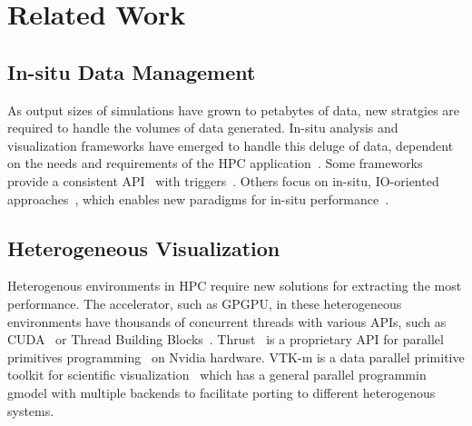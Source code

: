 \section{Related Work}
\subsection{In-situ Data Management}
As output sizes of simulations have grown to petabytes of data, new stratgies are required to handle the volumes of data generated. In-situ analysis and visualization frameworks have emerged to handle this deluge of data, dependent on the needs and requirements of the HPC application~\cite{Abbasi2010, Ayachit:2015:PCE:2828612.2828624,Childs:VisIt-HPV-Chapter:2012, 6846460}. Some frameworks provide a consistent API~\cite{Ayachit:2016:SGS:3018859.3018867,Larsen:2017:ASI:3144769.3144778} with triggers~\cite{Larsen:2018:FSS:3281464.3281468}. Others focus on in-situ, IO-oriented approaches~\cite{doi:10.1002/cpe.3125}, which enables new paradigms for in-situ performance~\cite{Kress:ISC19}.

\subsection{Heterogeneous Visualization}
Heterogenous environments in HPC require new solutions for extracting the most performance. The accelerator, such as GPGPU, in these heterogeneous environments have thousands of concurrent threads with various APIs, such as CUDA~\cite{CUDA} or Thread Building Blocks~\cite{books:daglib:0018624}. Thrust~\cite{hoberock2009thrust} is a proprietary API for parallel primitives programming~\cite{Blelloch:1990:VMD:91254} on Nvidia hardware. VTK-m is a data parallel primitive toolkit for scientific visualization~\cite{vtkm} which has a general parallel programmin gmodel with multiple backends to facilitate porting to different heterogenous systems. 

